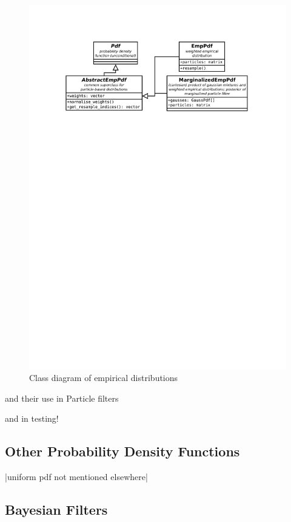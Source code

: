 \begin{figure}[h]
	\centering
	\includegraphics[width=\textwidth,keepaspectratio=true,clip=true,trim=3cm 210mm 3cm 3cm]{./diagrams/emp_pdfs.pdf}
	\vspace{-8mm}
	\caption{Class diagram of empirical distributions}
	\label{fig:DiaEmpPdfs}
\end{figure}

and their use in Particle filters

and in testing!

\subsection{Other Probability Density Functions}

|uniform pdf not mentioned elsewhere|

\subsection{Bayesian Filters}

